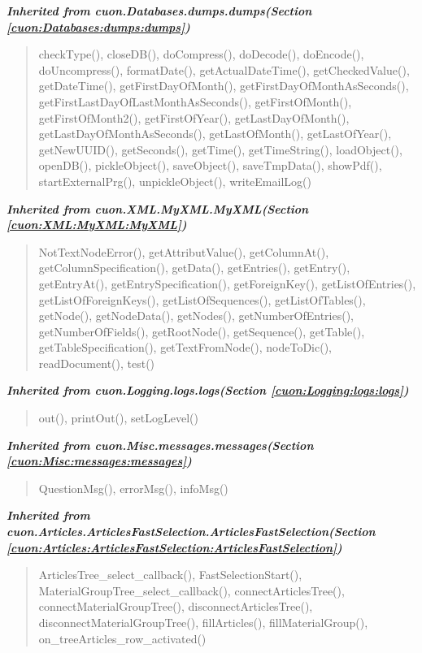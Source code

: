 \large{\textbf{\textit{Inherited from cuon.Databases.dumps.dumps\textit{(Section \ref{cuon:Databases:dumps:dumps})}}}}

\begin{quote}
checkType(), closeDB(), doCompress(), doDecode(), doEncode(), doUncompress(), formatDate(), getActualDateTime(), getCheckedValue(), getDateTime(), getFirstDayOfMonth(), getFirstDayOfMonthAsSeconds(), getFirstLastDayOfLastMonthAsSeconds(), getFirstOfMonth(), getFirstOfMonth2(), getFirstOfYear(), getLastDayOfMonth(), getLastDayOfMonthAsSeconds(), getLastOfMonth(), getLastOfYear(), getNewUUID(), getSeconds(), getTime(), getTimeString(), loadObject(), openDB(), pickleObject(), saveObject(), saveTmpData(), showPdf(), startExternalPrg(), unpickleObject(), writeEmailLog()
\end{quote}

\large{\textbf{\textit{Inherited from cuon.XML.MyXML.MyXML\textit{(Section \ref{cuon:XML:MyXML:MyXML})}}}}

\begin{quote}
NotTextNodeError(), getAttributValue(), getColumnAt(), getColumnSpecification(), getData(), getEntries(), getEntry(), getEntryAt(), getEntrySpecification(), getForeignKey(), getListOfEntries(), getListOfForeignKeys(), getListOfSequences(), getListOfTables(), getNode(), getNodeData(), getNodes(), getNumberOfEntries(), getNumberOfFields(), getRootNode(), getSequence(), getTable(), getTableSpecification(), getTextFromNode(), nodeToDic(), readDocument(), test()
\end{quote}

\large{\textbf{\textit{Inherited from cuon.Logging.logs.logs\textit{(Section \ref{cuon:Logging:logs:logs})}}}}

\begin{quote}
out(), printOut(), setLogLevel()
\end{quote}

\large{\textbf{\textit{Inherited from cuon.Misc.messages.messages\textit{(Section \ref{cuon:Misc:messages:messages})}}}}

\begin{quote}
QuestionMsg(), errorMsg(), infoMsg()
\end{quote}

\large{\textbf{\textit{Inherited from cuon.Articles.ArticlesFastSelection.ArticlesFastSelection\textit{(Section \ref{cuon:Articles:ArticlesFastSelection:ArticlesFastSelection})}}}}

\begin{quote}
ArticlesTree\_select\_callback(), FastSelectionStart(), MaterialGroupTree\_select\_callback(), connectArticlesTree(), connectMaterialGroupTree(), disconnectArticlesTree(), disconnectMaterialGroupTree(), fillArticles(), fillMaterialGroup(), on\_treeArticles\_row\_activated()
\end{quote}
